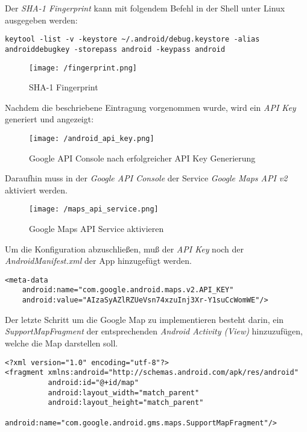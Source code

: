\newpage

Der \textit{SHA-1 Fingerprint} kann mit folgendem Befehl in der Shell unter Linux ausgegeben werden: 

\begin{lstlisting}[caption={Fingerprint Ausgabe},label=lst:FingerprintOutput]
keytool -list -v -keystore ~/.android/debug.keystore -alias androiddebugkey -storepass android -keypass android
\end{lstlisting}

\begin{figure}[H]
\centering
\texttt{[image: /fingerprint.png]}
\caption[User Interface: SHA-1 Fingerprint]{SHA-1 Fingerprint}
\label{fig:fingerprint}
\end{figure}
\bigskip
Nachdem die beschriebene Eintragung vorgenommen wurde, wird ein \textit{API Key} generiert und angezeigt:

\begin{figure}[H]
\centering
\texttt{[image: /android\_api\_key.png]}
\caption{Google API Console nach erfolgreicher API Key Generierung}
\label{fig:apiKeyGen}
\end{figure}
\bigskip
Daraufhin muss in der \textit{Google API Console} der Service \textit{Google Maps API v2} aktiviert werden.

\begin{figure}[H]
\centering
\texttt{[image: /maps\_api\_service.png]}
\caption{Google Maps API Service aktivieren}
\label{fig:mapsApiService}
\end{figure} 
\bigskip
Um die Konfiguration abzuschließen, muß der \textit{API Key} noch der \textit{AndroidManifest.xml} der App hinzugefügt werden.

\begin{lstlisting}[caption={Google Map API Key hinzufügen},label=lst:MapApiKeyInsert]
<meta-data
    android:name="com.google.android.maps.v2.API_KEY"
    android:value="AIzaSyAZlRZUeVsn74xzuInj3Xr-Y1suCcWomWE"/>
\end{lstlisting}
\bigskip
Der letzte Schritt um die Google Map zu implementieren besteht darin, ein \textit{SupportMapFragment} der entsprechenden \textit{Android Activity (View)} hinzuzufügen, welche die Map darstellen soll.

\begin{lstlisting}[caption={SupportMapFragment hinzufügen},label=lst:SupportMapFragmentInsert]
<?xml version="1.0" encoding="utf-8"?>
<fragment xmlns:android="http://schemas.android.com/apk/res/android"
          android:id="@+id/map"
          android:layout_width="match_parent"
          android:layout_height="match_parent"
          android:name="com.google.android.gms.maps.SupportMapFragment"/>
\end{lstlisting}

